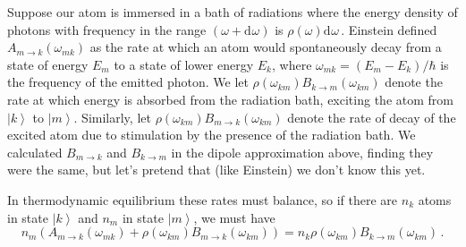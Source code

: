 \documentclass{article}
\theoremstyle{plain}\theoremheaderfont{\normalfont\itshape}\theorembodyfont{\rmfamily}\theoremseparator{.}\newtheorem*{rem}{Remark}\newtheorem*{ex}{Example}\newtheorem*{proof}{Proof}\newtheorem*{altp}{Alternative proof}
\theoremstyle{plain}\theoremheaderfont{\normalfont\bfseries}\theorembodyfont{\rmfamily}\theoremseparator{.}\newtheorem{thm}{Theorem}[section]\newtheorem{lem}[thm]{Lemma}\newtheorem{prop}[thm]{Proposition}\newtheorem*{cor}{Corollary}\newtheorem{defn}[thm]{Definition}\newtheorem{clm}[thm]{Claim}\newtheorem{clminproof}{Claim}
\theoremstyle{break}\theoremheaderfont{\normalfont\itshape}\theorembodyfont{\rmfamily}\theoremseparator{.\medskip}\newtheorem*{proofskip}{Proof}\newtheorem*{exs}{Examples}\newtheorem*{rems}{Remarks}
\theoremstyle{break}\theoremheaderfont{\normalfont\bfseries}\theorembodyfont{\rmfamily}\theoremseparator{.\medskip}\newtheorem{lemskip}[thm]{Lemma}\newtheorem{defnskip}[thm]{Definition}\newtheorem{propskip}[thm]{Proposition}\newtheorem{thmskip}[thm]{Theorem}
\numberwithin{equation}{section}
\newcommand{\dd}[2][]{\mathrm{d}^{#1} #2\,}
\renewcommand{\d}[2][]{\mathrm{d}^{#1} #2}
\newcommand{\ket}[1]{\left| #1 \right\rangle}
\begin{document}
    Suppose our atom is immersed in a bath of radiations where the energy density of photons with frequency in the range \((\omega+\d{\omega})\) is \(\rho(\omega)\dd{\omega}\). Einstein defined \(A_{m\to k}(\omega_{mk})\) as the rate at which an atom would spontaneously decay from a state of energy \(E_m\) to a state of lower energy \(E_k\), where \(\omega_{mk}=(E_m-E_k)/\hbar\) is the frequency of the emitted photon. We let \(\rho(\omega_{km}) B_{k\to m}(\omega_{km})\) denote the rate at which energy is absorbed from the radiation bath, exciting the atom from \(\ket{k}\) to \(\ket{m}\). Similarly, let \(\rho(\omega_{km})B_{m\to k}(\omega_{km})\) denote the rate of decay of the excited atom due to stimulation by the presence of the radiation bath. We calculated \(B_{m\to k}\) and \(B_{k\to m}\) in the dipole approximation above, finding they were the same, but let's pretend that (like Einstein) we don't know this yet.

    In thermodynamic equilibrium these rates must balance, so if there are \(n_k\) atoms in state \(\ket{k}\) and \(n_m\) in state \(\ket{m}\), we must have
    \begin{equation}\label{rate_equilibrium}
        n_m(A_{m\to k}(\omega_{mk})+\rho(\omega_{km})B_{m\to k}(\omega_{km}))=n_k\rho(\omega_{km})B_{k\to m}(\omega_{km})\,.
    \end{equation}
\end{document}
